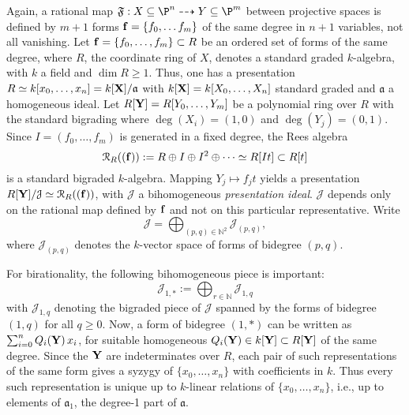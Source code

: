 \documentclass[11pt]{amsart}
\numberwithin{equation}{theorem}
\def\ff{{\bf f}}
\def\XX{{\bf X}}
\def\YY{{\bf Y}}
\renewcommand{\:}{\colon}
\DeclareMathOperator{\edim}{edim}
\theoremstyle{theorem}
\begin{document}
Again, a rational map $\mathfrak{F}:X\subseteq \P^n\dasharrow Y \subseteq \P^m$ between projective spaces is defined by $m+1$ forms $\ff=\{f_0,\ldots f_m\}$ of the same degree in $n+1$ variables, not all vanishing.  Let $\ff=\{f_0,\ldots,f_m\}\subset R$ be an ordered set of forms of the same degree,
where $R$, the coordinate ring of $X$,  denotes a standard graded $k$-algebra, with $k$ a field and $\dim R\geq 1$.
Thus, one has a presentation $R\simeq k[x_0,\ldots, x_n]=k[\XX]/\mathfrak{a}$ with $k[\XX]=k[X_0,\ldots, X_n]$
standard graded and $\mathfrak{a}$ a homogeneous ideal.
Let $R[\YY]=R[Y_0,\ldots,Y_m]$ be a polynomial ring over $R$ with the standard bigrading
where $\deg(X_i)=(1,0)$ and $\deg(Y_j)=(0,1)$.
Since $I = (f_0, \dots, f_m)$ is generated in a fixed degree, the Rees algebra
$${\mathcal R}_R((\ff)):=R\oplus I\oplus I^2\oplus \cdots \simeq R[It]\subset R[t]$$
is a standard bigraded $k$-algebra. Mapping $Y_j\mapsto f_jt$ yields
a presentation $R[\YY]/\mathcal{J}\simeq {\mathcal R}_R((\ff))$, with $\mathcal{J}$ a bihomogeneous {\em presentation
ideal}.
$\mathcal{J}$ depends only on the rational map defined by $\ff$
and not on this particular representative.
Write
$${\mathcal J}=\bigoplus_{(p,q)\in \mathbb{N}^2} {\mathcal J}_{(p,q)},$$
where ${\mathcal J}_{(p,q)}$ denotes the $k$-vector space of forms of bidegree $(p,q)$.



For birationality, the following bihomogeneous piece is  important:
$${\mathcal J}_{1,*}:=\bigoplus_{r\in\mathbb{N}} {\mathcal J}_{1,q}$$
with ${\mathcal J}_{1,q}$ denoting the bigraded piece of ${\mathcal J}$ spanned by the forms of bidegree
 $(1,q)$ for all $q\geq 0$. Now, a form of bidegree $(1,*)$ can be written as $\sum_{i=0}^n Q_i(\YY)\,x_i$, for suitable homogeneous $Q_i(\YY)\in k[\YY]\subset R[\YY]$
of the same degree.
Since the $\YY$ are indeterminates over $R$, each pair of such representations of the same form gives a syzygy of $\{x_0,\ldots,x_n\}$
with coefficients in $k$. Thus every such representation is unique  up to $k$-linear relations
of $\{x_0,\ldots,x_n\}$,  i.e., up to elements of ${\mathfrak a}_1$, the degree-1 part of $\mathfrak a$.

\end{document}
